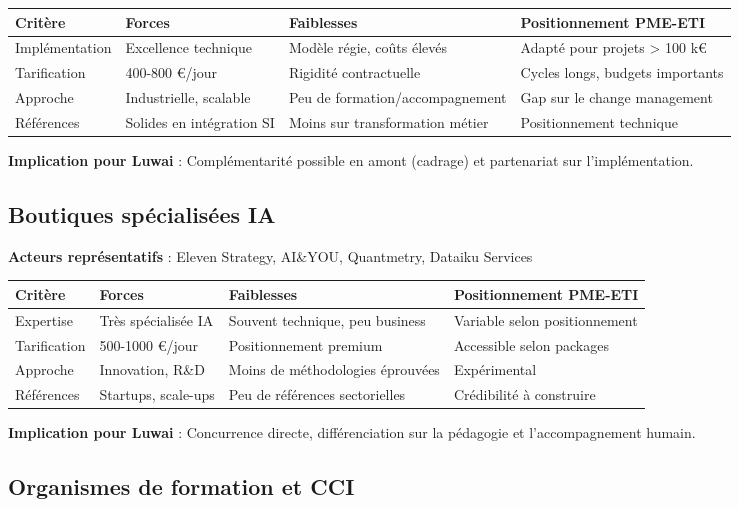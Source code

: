 \begin{longtable}{@{}p{3cm}p{4cm}p{4cm}p{4cm}@{}}
\toprule
\textbf{Critère} & \textbf{Forces} & \textbf{Faiblesses} & \textbf{Positionnement PME-ETI} \\
\midrule
Implémentation & Excellence technique & Modèle régie, coûts élevés & Adapté pour projets > 100 k€ \\
Tarification & 400-800 €/jour & Rigidité contractuelle & Cycles longs, budgets importants \\
Approche & Industrielle, scalable & Peu de formation/accompagnement & Gap sur le change management \\
Références & Solides en intégration SI & Moins sur transformation métier & Positionnement technique \\
\bottomrule
\end{longtable}

\textbf{Implication pour Luwai} : Complémentarité possible en amont (cadrage) et partenariat sur l'implémentation.

\subsection{Boutiques spécialisées IA}

\textbf{Acteurs représentatifs} : Eleven Strategy, AI\&YOU, Quantmetry, Dataiku Services

\begin{longtable}{@{}p{3cm}p{4cm}p{4cm}p{4cm}@{}}
\toprule
\textbf{Critère} & \textbf{Forces} & \textbf{Faiblesses} & \textbf{Positionnement PME-ETI} \\
\midrule
Expertise & Très spécialisée IA & Souvent technique, peu business & Variable selon positionnement \\
Tarification & 500-1000 €/jour & Positionnement premium & Accessible selon packages \\
Approche & Innovation, R\&D & Moins de méthodologies éprouvées & Expérimental \\
Références & Startups, scale-ups & Peu de références sectorielles & Crédibilité à construire \\
\bottomrule
\end{longtable}

\textbf{Implication pour Luwai} : Concurrence directe, différenciation sur la pédagogie et l'accompagnement humain.

\subsection{Organismes de formation et CCI}

